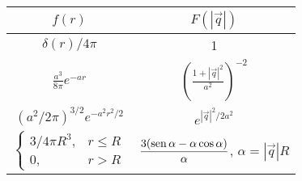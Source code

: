 \begin{tabular}{|c|c|}
	$f(r)$ & $F(|\vec{q}|)$ \\
	\hline
	 $\delta (r) / 4 \pi$ & 1 \\
	$\displaystyle \frac{a^3}{8\pi} e^{-ar}$ &
	$\displaystyle \left(\frac{1 + |\vec{q}|^2}{a^2}\right) ^{-2}$\\
	$ \left( a^2 / 2\pi \right)^{3/2} e
	^{-a^2 r^2 / 2}$ & $e^{|\vec{q}|^2 / 2a^2 }$ \\
	 $\displaystyle \begin{cases}
		3/4\pi R^3, & r \leq R \\
		0, & r > R
	\end{cases}$ & $ \displaystyle \frac{3(\operatorname*{sen} \alpha - \alpha \cos
	\alpha)}{\alpha}$, $\alpha = |\vec{q}| R$ 
	\\
\end{tabular}


